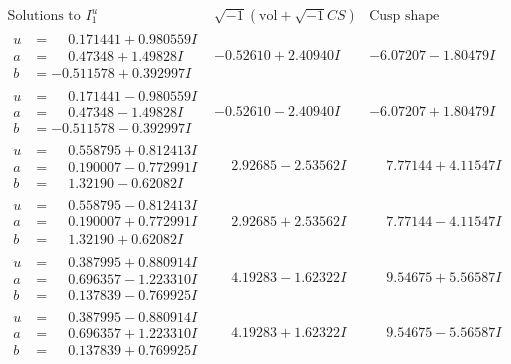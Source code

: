 \documentclass[1p]{elsarticle_modified}
\theoremstyle{definition}
\newcommand{\I}{\sqrt{-1}}
\begin{document}
$$\begin{array}{c|c|c}  
\text{Solutions to }I^u_{1}& \I (\text{vol} + \sqrt{-1}CS) & \text{Cusp shape}\\
 \hline 
\begin{aligned}
u &= \phantom{-}0.171441 + 0.980559 I \\
a &= \phantom{-}0.47348 + 1.49828 I \\
b &= -0.511578 + 0.392997 I\end{aligned}
 & -0.52610 + 2.40940 I & -6.07207 - 1.80479 I \\ \hline\begin{aligned}
u &= \phantom{-}0.171441 - 0.980559 I \\
a &= \phantom{-}0.47348 - 1.49828 I \\
b &= -0.511578 - 0.392997 I\end{aligned}
 & -0.52610 - 2.40940 I & -6.07207 + 1.80479 I \\ \hline\begin{aligned}
u &= \phantom{-}0.558795 + 0.812413 I \\
a &= \phantom{-}0.190007 - 0.772991 I \\
b &= \phantom{-}1.32190 - 0.62082 I\end{aligned}
 & \phantom{-}2.92685 - 2.53562 I & \phantom{-}7.77144 + 4.11547 I \\ \hline\begin{aligned}
u &= \phantom{-}0.558795 - 0.812413 I \\
a &= \phantom{-}0.190007 + 0.772991 I \\
b &= \phantom{-}1.32190 + 0.62082 I\end{aligned}
 & \phantom{-}2.92685 + 2.53562 I & \phantom{-}7.77144 - 4.11547 I \\ \hline\begin{aligned}
u &= \phantom{-}0.387995 + 0.880914 I \\
a &= \phantom{-}0.696357 - 1.223310 I \\
b &= \phantom{-}0.137839 - 0.769925 I\end{aligned}
 & \phantom{-}4.19283 - 1.62322 I & \phantom{-}9.54675 + 5.56587 I \\ \hline\begin{aligned}
u &= \phantom{-}0.387995 - 0.880914 I \\
a &= \phantom{-}0.696357 + 1.223310 I \\
b &= \phantom{-}0.137839 + 0.769925 I\end{aligned}
 & \phantom{-}4.19283 + 1.62322 I & \phantom{-}9.54675 - 5.56587 I \\ \hline\begin{aligned}

\end{aligned}
\end{array}$$
\end{document}

